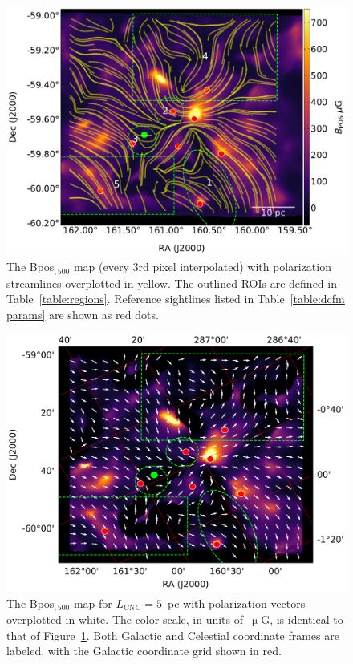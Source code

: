 \begin{figure}[!htbp]
\centering
\includegraphics[width=\textwidth]{figures/carina/cftHI_5arcmin_500_5p0pc}
\caption[~The  map (every 3rd pixel interpolated) with polarization streamlines overplotted in yellow.]{The \gls{Bpos}$_{,500}$ map (every 3rd pixel interpolated) with polarization streamlines overplotted in yellow. The outlined ROIs are defined in Table~\ref{table:regions}. Reference sightlines listed in Table~\ref{table:dcfm params} are shown as red dots.}
\label{fig:DCFM_5_500}
\end{figure}

\begin{figure}[!htbp]
\centering
\includegraphics[width=\textwidth]{figures/carina/B_vectors_500_5p0pc}
\caption[~The  map for ~pc with polarization vectors overplotted in white.]{The \gls{Bpos}$_{,500}$ map for $L_{\mathrm{CNC}} = 5$~pc with polarization vectors overplotted in white. The color scale, in units of~$\upmu$G, is identical to that of Figure~\ref{fig:DCFM_5_500}. Both Galactic and Celestial coordinate frames are labeled, with the Galactic coordinate grid shown in red.}
\label{fig:Bpos_vectors}
\end{figure}

